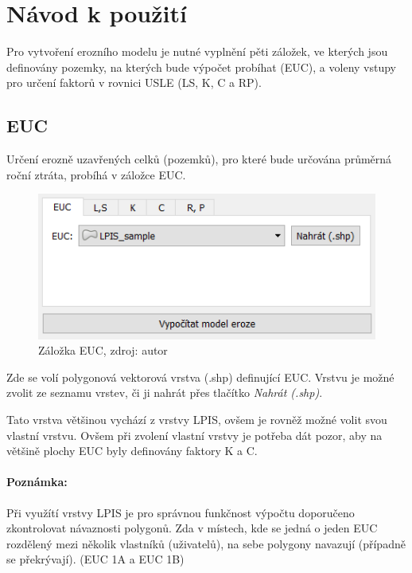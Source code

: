 \section{Návod k použití}
\label{navod_k_pouziti} Pro vytvoření erozního modelu je nutné
vyplnění pěti záložek, ve kterých jsou definovány pozemky, na kterých
bude výpočet probíhat (EUC), a voleny vstupy pro určení faktorů v
rovnici USLE (LS, K, C a RP).
\subsection{EUC} Určení erozně uzavřených celků (pozemků), pro které
bude určována průměrná roční ztráta, probíhá v záložce EUC.

	\begin{figure}[H] \centering
		\includegraphics[width=.5\textwidth]{./pictures/euc.png}
		\caption[Záložka EUC]{Záložka EUC, zdroj: autor}
		\label{zalozka_euc}
 	\end{figure}

Zde se volí polygonová vektorová vrstva (.shp) definující EUC. Vrstvu
je možné zvolit ze seznamu vrstev, či ji nahrát přes tlačítko
\textit{Nahrát (.shp)}.

Tato vrstva většinou vychází z vrstvy LPIS, ovšem je rovněž možné
volit svou vlastní vrstvu. Ovšem při zvolení vlastní vrstvy je potřeba
dát pozor, aby na většině plochy EUC byly definovány faktory K a C.

\paragraph{Poznámka:} Při využítí vrstvy LPIS je pro správnou
funkčnost výpočtu doporučeno zkontrolovat návaznosti polygonů. Zda v
místech, kde se jedná o jeden EUC rozdělený mezi několik vlastníků
(uživatelů), na sebe polygony navazují (případně se překrývají). (EUC
1A a EUC 1B)

